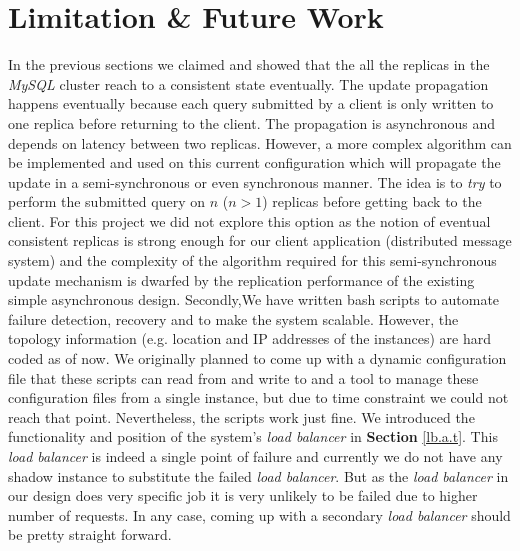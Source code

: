 \documentclass[12pt]{article}
\begin{document}
\section{Limitation \& Future Work}

In the previous sections we claimed and showed that the all the replicas in the \emph{MySQL} cluster reach to a consistent state eventually. The update propagation happens eventually because each query submitted by a client is only written to one replica before returning to the client. The propagation is asynchronous and depends on latency between two replicas. However, a more complex algorithm can be implemented and used on this current configuration which will propagate the update in a semi-synchronous or even synchronous manner. The idea is to \emph{try} to perform the submitted query on $n$ ($n > 1$) replicas before getting back to the client. For this project we did not explore this option as the notion of eventual consistent replicas is strong enough for our client application (distributed message system) and the complexity of the algorithm required for this semi-synchronous update mechanism is dwarfed by the replication performance of the existing simple asynchronous design. Secondly,We have written bash scripts to automate failure detection, recovery and to make the system scalable. However, the topology information (e.g. location and IP addresses of the instances) are hard coded as of now. We originally planned to come up with a dynamic configuration file that these scripts can read from and write to and a tool to manage these configuration files from a single instance, but due to time constraint we could not reach that point. Nevertheless, the scripts work just fine. We introduced the functionality and position of the system\rq{}s \emph{load balancer} in \textbf{Section } \ref{lb.a.t}. This \emph{load balancer} is indeed a single point of failure and currently we do not have any shadow instance to substitute the failed \emph{load balancer}. But as the \emph{load balancer} in our design does very specific job it is very unlikely to be failed due to higher number of requests. In any case, coming up with a secondary \emph{load balancer} should be pretty straight forward. 
\end{document}
